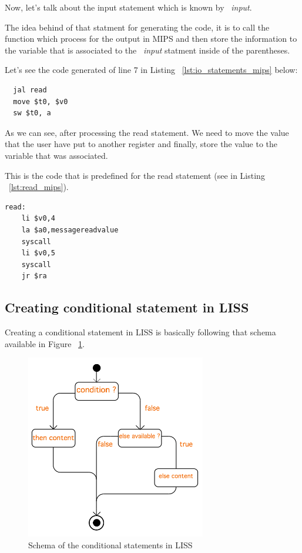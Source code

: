 \documentclass[
  oneside,
  11pt, a4paper,
  footinclude=true,
  headinclude=true,
  cleardoublepage=empty
]{scrbook}
\begin{document}
Now, let's talk about the input statement which is known by ~\textit{input}.

The idea behind of that statment for generating the code, it is to call the function which process for the output in MIPS and then store the information to the variable that is associated to the ~\textit{input} statment inside of the parentheses.

Let's see the code generated of line 7 in Listing ~\ref{lst:io_statements_mips} below:

\begin{lstlisting}
  jal read		
  move $t0, $v0		
  sw $t0, a		
\end{lstlisting}

As we can see, after processing the read statement. We need to move the value that the user have put to another register and finally, store the value to the variable that was associated.

This is the code that is predefined for the read statement (see in Listing ~\ref{lst:read_mips}).

\begin{lstlisting}[caption={Read statement code in MIPS},label={lst:read_mips}]
  read: 
    li $v0,4
    la $a0,messagereadvalue
    syscall
    li $v0,5
    syscall
    jr $ra
\end{lstlisting}

\subsection{Creating conditional statement in LISS}

Creating a conditional statement in LISS is basically following that schema available in Figure ~\ref{fig:conditional_figure}.

\begin{figure}[h!]
  \centering
    \includegraphics[width=0.7\textwidth]{img/conditional_statement.png}
    \caption{Schema of the conditional statements in LISS}
    \label{fig:conditional_figure}
\end{figure}
\end{document}

